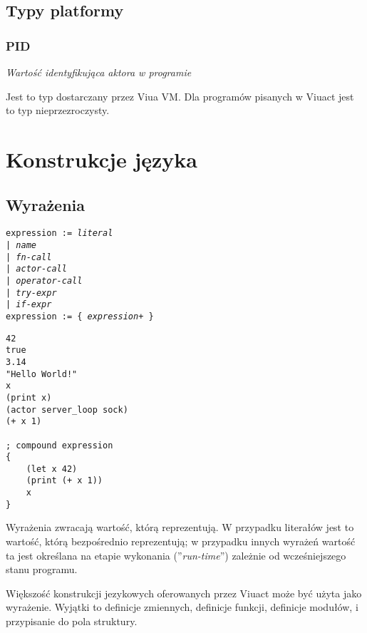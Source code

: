 \subsection{Typy platformy}

\subsubsection{PID}

\emph{Wartość identyfikująca aktora w programie}

Jest to typ dostarczany przez Viua VM. Dla programów pisanych w Viuact jest to
typ nieprzezroczysty.

\section{Konstrukcje języka}

\subsection{Wyrażenia}
\label{language_expressions}

\texttt{expression := \emph{literal} \\
\phantom{expression :}| \emph{name} \\
\phantom{expression :}| \emph{fn-call} \\
\phantom{expression :}| \emph{actor-call} \\
\phantom{expression :}| \emph{operator-call} \\
\phantom{expression :}| \emph{try-expr} \\
\phantom{expression :}| \emph{if-expr}}
\\
\texttt{expression := \{ \emph{expression}+ \}}

\begin{lstlisting}
42
true
3.14
"Hello World!"
x
(print x)
(actor server_loop sock)
(+ x 1)

; compound expression
{
    (let x 42)
    (print (+ x 1))
    x
}
\end{lstlisting}

Wyrażenia zwracają wartość, którą reprezentują. W przypadku literałów jest to wartość, którą bezpośrednio
reprezentują; w przypadku innych wyrażeń wartość ta jest określana na etapie wykonania (''\emph{run-time}'')
zależnie od wcześniejszego stanu programu.

Większość konstrukcji jezykowych oferowanych przez Viuact może być użyta jako wyrażenie.
Wyjątki to definicje zmiennych, definicje funkcji, definicje modułów, i przypisanie do pola struktury.

